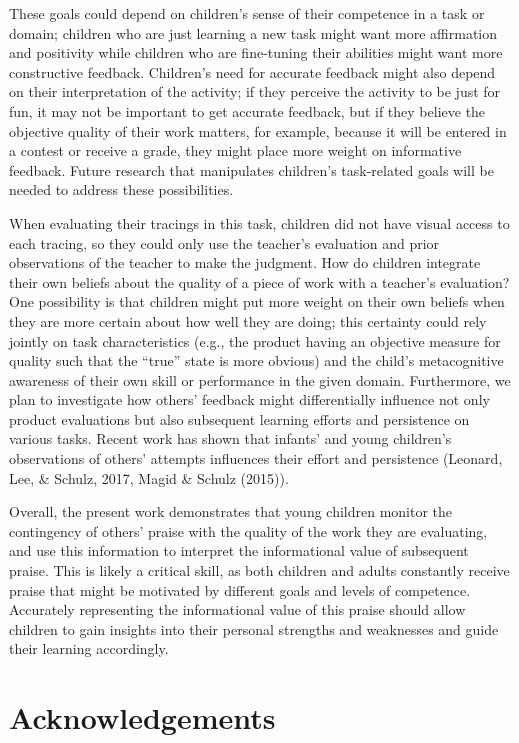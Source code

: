 \documentclass[10pt, letterpaper]{article}
\begin{document}
These goals could depend on children's sense of their competence in a
task or domain; children who are just learning a new task might want
more affirmation and positivity while children who are fine-tuning their
abilities might want more constructive feedback. Children's need for
accurate feedback might also depend on their interpretation of the
activity; if they perceive the activity to be just for fun, it may not
be important to get accurate feedback, but if they believe the objective
quality of their work matters, for example, because it will be entered
in a contest or receive a grade, they might place more weight on
informative feedback. Future research that manipulates children's
task-related goals will be needed to address these possibilities.

When evaluating their tracings in this task, children did not have
visual access to each tracing, so they could only use the teacher's
evaluation and prior observations of the teacher to make the judgment.
How do children integrate their own beliefs about the quality of a piece
of work with a teacher's evaluation? One possibility is that children
might put more weight on their own beliefs when they are more certain
about how well they are doing; this certainty could rely jointly on task
characteristics (e.g., the product having an objective measure for
quality such that the ``true'' state is more obvious) and the child's
metacognitive awareness of their own skill or performance in the given
domain. Furthermore, we plan to investigate how others' feedback might
differentially influence not only product evaluations but also
subsequent learning efforts and persistence on various tasks. Recent
work has shown that infants' and young children's observations of
others' attempts influences their effort and persistence (Leonard, Lee,
\& Schulz, 2017, Magid \& Schulz (2015)).

Overall, the present work demonstrates that young children monitor the
contingency of others' praise with the quality of the work they are
evaluating, and use this information to interpret the informational
value of subsequent praise. This is likely a critical skill, as both
children and adults constantly receive praise that might be motivated by
different goals and levels of competence. Accurately representing the
informational value of this praise should allow children to gain
insights into their personal strengths and weaknesses and guide their
learning accordingly.

\section{Acknowledgements}\label{acknowledgements}
\end{document}
